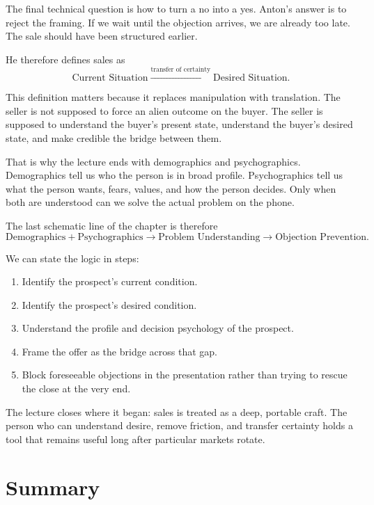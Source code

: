 The final technical question is how to turn a no into a yes. Anton's answer is to reject the framing. If we wait until the objection arrives, we are already too late. The sale should have been structured earlier.

He therefore defines sales as
\begin{equation}
\text{Current Situation} \xrightarrow{\text{transfer of certainty}} \text{Desired Situation}.
\end{equation}

This definition matters because it replaces manipulation with translation. The seller is not supposed to force an alien outcome on the buyer. The seller is supposed to understand the buyer's present state, understand the buyer's desired state, and make credible the bridge between them.

That is why the lecture ends with demographics and psychographics. Demographics tell us who the person is in broad profile. Psychographics tell us what the person wants, fears, values, and how the person decides. Only when both are understood can we solve the actual problem on the phone.

The last schematic line of the chapter is therefore
\begin{equation}
\text{Demographics} + \text{Psychographics} \to \text{Problem Understanding} \to \text{Objection Prevention}.
\end{equation}

We can state the logic in steps:
\begin{enumerate}
\item Identify the prospect's current condition.
\item Identify the prospect's desired condition.
\item Understand the profile and decision psychology of the prospect.
\item Frame the offer as the bridge across that gap.
\item Block foreseeable objections in the presentation rather than trying to rescue the close at the very end.
\end{enumerate}

The lecture closes where it began: sales is treated as a deep, portable craft. The person who can understand desire, remove friction, and transfer certainty holds a tool that remains useful long after particular markets rotate.

\section{Summary}

